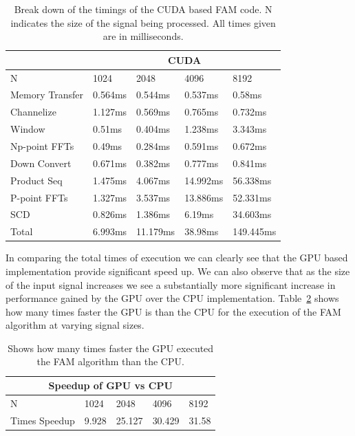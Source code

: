 \begin{table}
\begin{center}
\begin{tabular}{|l|l|l|l|l|}
\hline
 & \multicolumn{4}{|c|}{CUDA} \\
\hline
N & 1024 & 2048 & 4096 & 8192 \\
\hline
Memory Transfer & 0.564ms & 0.544ms & 0.537ms & 0.58ms \\
Channelize & 1.127ms & 0.569ms & 0.765ms & 0.732ms \\
Window & 0.51ms & 0.404ms & 1.238ms & 3.343ms \\
Np-point FFTs & 0.49ms & 0.284ms & 0.591ms & 0.672ms \\
Down Convert & 0.671ms & 0.382ms & 0.777ms & 0.841ms \\
Product Seq & 1.475ms & 4.067ms & 14.992ms & 56.338ms \\
P-point FFTs & 1.327ms & 3.537ms & 13.886ms & 52.331ms \\
SCD & 0.826ms & 1.386ms & 6.19ms & 34.603ms \\
\hline
Total & 6.993ms & 11.179ms & 38.98ms & 149.445ms \\
\hline
\end{tabular}
\caption{Break down of the timings of the CUDA based FAM code.  N indicates the size of the signal being processed.  All times given are in milliseconds.}
\label{tbl:fam_cuda_timings}
\end{center}
\end{table}

In comparing the total times of execution we can clearly see that the GPU based implementation provide significant speed up.  We can also observe that as the size of the input signal increases we see a substantially more significant increase in performance gained by the GPU over the CPU implementation.  Table~\ref{tbl:fam_gpu_speedup} shows how many times faster the GPU is than the CPU for the execution of the FAM algorithm at varying signal sizes.

\begin{table}
\begin{center}
\begin{tabular}{|l|l|l|l|l|}
\hline
\multicolumn{5}{|c|}{Speedup of GPU vs CPU} \\
\hline
N & 1024 & 2048 & 4096 & 8192 \\
\hline
Times Speedup & 9.928 & 25.127 & 30.429 & 31.58 \\
\hline
\end{tabular}
\caption{Shows how many times faster the GPU executed the FAM algorithm than the CPU.}
\label{tbl:fam_gpu_speedup}
\end{center}
\end{table}

